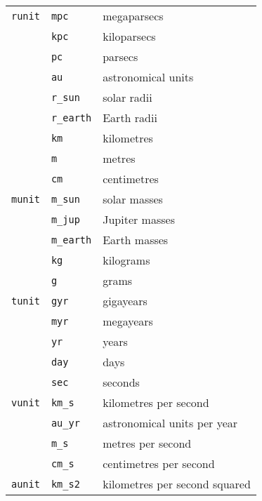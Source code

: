 \documentclass[a4paper]{article}
\newcommand{\var}[1]{\texttt{#1}}
\begin{document}
\tabletail{\hline}
\tablelasttail{\hline}
\begin{center}
\begin{supertabular}{|p{3cm}|p{3cm}|p{6cm}|}
\var{runit}     & \var{mpc}       & megaparsecs \\
                & \var{kpc}       & kiloparsecs \\
                & \var{pc}        & parsecs \\
                & \var{au}        & astronomical units \\
                & \var{r\_sun}    & solar radii \\
                & \var{r\_earth}  & Earth radii \\
                & \var{km}        & kilometres \\
                & \var{m}         & metres \\
                & \var{cm}        & centimetres \\ \hline
\var{munit}     & \var{m\_sun}    & solar masses \\ 
                & \var{m\_jup}    & Jupiter masses \\
                & \var{m\_earth}  & Earth masses \\
                & \var{kg}        & kilograms \\
                & \var{g}         & grams \\ \hline
\var{tunit}     & \var{gyr}       & gigayears \\
                & \var{myr}       & megayears \\
                & \var{yr}        & years \\
                & \var{day}       & days \\
                & \var{sec}       & seconds \\ \hline
\var{vunit}     & \var{km\_s}     & kilometres per second  \\
                & \var{au\_yr}    & astronomical units per year \\
                & \var{m\_s}      & metres per second \\
                & \var{cm\_s}     & centimetres per second \\ \hline
\var{aunit}     & \var{km\_s2}    & kilometres per second squared \\

\end{supertabular}
\end{center}
\end{document}
